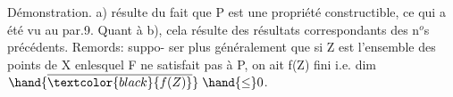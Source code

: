 Démonstration. a) résulte du fait que P est une propriété
constructible, ce qui a été vu au par.9. Quant à b), cela résulte
des résultats correspondants des  n$^{o}$s précédents. Remords: suppo-%
ser plus généralement que si Z est l'ensemble des points de X enlesquel%
F ne satisfait pas à P, on ait f(Z) fini i.e. dim $\hand{\overline{\textcolor{black}{f(Z)}}}\;\hand{\leq}0$.


